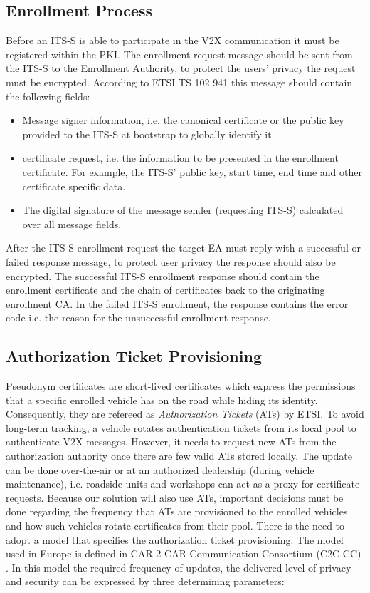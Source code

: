 \subsection{Enrollment Process}

Before an ITS-S is able to participate in the V2X communication it must be registered within the PKI. The enrollment request message should be sent from the ITS-S to the Enrollment Authority, to protect the users' privacy the request must be encrypted. According to ETSI TS 102 941 \cite{etsi_privacy} this message should contain the following fields:
\begin{itemize}
	\item{ Message signer information, i.e. the canonical certificate or the public key provided to the ITS-S at bootstrap to globally identify it.}
	\item{ certificate request, i.e. the information to be presented in the enrollment certificate. For example, the ITS-S' public key, start time, end time and other certificate specific data.}
	\item{ The digital signature of the message sender (requesting ITS-S) calculated over all message fields.}
\end{itemize}
After the ITS-S enrollment request the target EA must reply with a successful or failed response message, to protect user privacy the response should also be encrypted. The successful ITS-S enrollment response should contain the enrollment certificate and the chain of certificates back to the originating enrollment CA. In the failed ITS-S enrollment, the response contains the error code i.e. the reason for the unsuccessful enrollment response. 


\subsection{Authorization Ticket Provisioning}
\label{section:at_usage}

Pseudonym certificates are short-lived certificates which express the permissions that a specific enrolled vehicle has on the road while hiding its identity. Consequently, they are refereed as \textit{Authorization Tickets} (ATs) by ETSI. To avoid long-term tracking, a vehicle rotates authentication tickets from its local pool to authenticate V2X messages. However, it needs to request new ATs from the authorization authority once there are few valid ATs stored locally. The update can be done over-the-air or at an authorized dealership (during vehicle maintenance), i.e. roadside-units and workshops can act as a proxy for certificate requests. Because our solution will also use ATs, important decisions must be done regarding the frequency that ATs are provisioned to the enrolled vehicles and how such vehicles rotate certificates from their pool. There is the need to adopt a model that specifies the authorization ticket provisioning. The model used in Europe is defined in CAR 2 CAR Communication Consortium (C2C-CC) \cite{generic_eu}. In this model the required frequency of updates, the delivered level of privacy and security can be expressed by three determining parameters:

